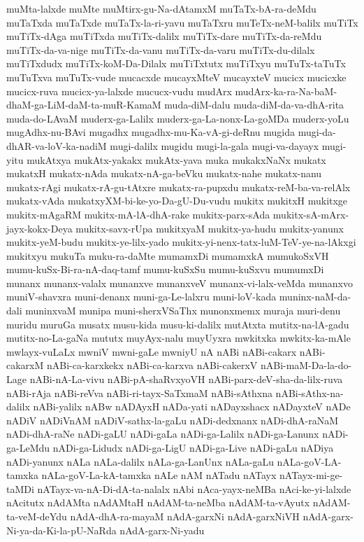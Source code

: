 {muMta-lalxde
muMte
muMtirx-gu-Na-dAtamxM
muTaTx-bA-ra-deMdu
muTaTxda
muTaTxde
muTaTx-la-ri-yavu
muTaTxru
muTeTx-neM-balilx
muTiTx
muTiTx-dAga
muTiTxda
muTiTx-dalilx
muTiTx-dare
muTiTx-da-reMdu
muTiTx-da-va-nige
muTiTx-da-vanu
muTiTx-da-varu
muTiTx-du-dilalx
muTiTxdudx
muTiTx-koM-Da-Dilalx
muTiTxtutx
muTiTxyu
muTuTx-taTuTx
muTuTxva
muTuTx-vude
mucacxde
mucayxMteV
mucayxteV
mucicx
mucicxke
mucicx-ruva
mucicx-ya-lalxde
mucucx-vudu
mudArx
mudArx-ka-ra-Na-baM-dhaM-ga-LiM-daM-ta-muR-KamaM
muda-diM-dalu
muda-diM-da-va-dhA-rita
muda-do-LAvaM
muderx-ga-Lalilx
muderx-ga-La-nonx-La-goMDa
muderx-yoLu
mugAdhx-nu-BAvi
mugadhx
mugadhx-mu-Ka-vA-gi-deRnu
mugida
mugi-da-dhAR-va-loV-ka-nadiM
mugi-dalilx
mugidu
mugi-la-gala
mugi-va-dayayx
mugi-yitu
mukAtxya
mukAtx-yakakx
mukAtx-yava
muka
mukakxNaNx
mukatx
mukatxH
mukatx-nAda
mukatx-nA-ga-beVku
mukatx-nahe
mukatx-nanu
mukatx-rAgi
mukatx-rA-gu-tAtxre
mukatx-ra-pupxdu
mukatx-reM-ba-va-relAlx
mukatx-vAda
mukatxyXM-bi-ke-yo-Da-gU-Du-vudu
mukitx
mukitxH
mukitxge
mukitx-mAgaRM
mukitx-mA-lA-dhA-rake
mukitx-parx-sAda
mukitx-sA-mArx-jayx-kokx-Deya
mukitx-savx-rUpa
mukitxyaM
mukitx-ya-hudu
mukitx-yanunx
mukitx-yeM-budu
mukitx-ye-lilx-yado
mukitx-yi-nenx-tatx-luM-TeV-ye-na-lAkxgi
mukitxyu
mukuTa
muku-ra-daMte
mumamxDi
mumamxkA
mumukoSxVH
mumu-kuSx-Bi-ra-nA-daq-tamf
mumu-kuSxSu
mumu-kuSxvu
mumumxDi
munanx
munanx-valalx
munanxve
munanxveV
munanx-vi-lalx-veMda
munanxvo
muniV-shavxra
muni-denanx
muni-ga-Le-lalxru
muni-loV-kada
muninx-naM-da-dali
muninxvaM
munipa
muni-sherxVSaThx
munonxmemx
muraja
muri-denu
muridu
muruGa
musatx
musu-kida
musu-ki-dalilx
mutAtxta
mutitx-na-lA-gadu
mutitx-no-La-gaNa
mututx
muyAyx-nalu
muyUyxra
mwkitxka
mwkitx-ka-mAle
mwlayx-vuLaLx
mwniV
mwni-gaLe
mwniyU
nA
nABi
nABi-cakarx
nABi-cakarxM
nABi-ca-karxkekx
nABi-ca-karxva
nABi-cakerxV
nABi-maM-Da-la-do-Lage
nABi-nA-La-vivu
nABi-pA-shaRvxyoVH
nABi-parx-deV-sha-da-lilx-ruva
nABi-rAja
nABi-reVva
nABi-ri-tayx-SaTxmaM
nABi-sAthxna
nABi-sAthx-na-dalilx
nABi-yalilx
nABw
nADAyxH
nADa-yati
nADayxshacx
nADayxteV
nADe
nADiV
nADiVnAM
nADiV-sathx-la-gaLu
nADi-dedxnanx
nADi-dhA-raNaM
nADi-dhA-raNe
nADi-gaLU
nADi-gaLa
nADi-ga-Lalilx
nADi-ga-Lanunx
nADi-ga-LeMdu
nADi-ga-Lidudx
nADi-ga-LigU
nADi-ga-Live
nADi-gaLu
nADiya
nADi-yanunx
nALa
nALa-dalilx
nALa-ga-LanUnx
nALa-gaLu
nALa-goV-LA-tamxka
nALa-goV-La-kA-tamxka
nALe
nAM
nATadu
nATayx
nATayx-mi-ge-taMDi
nATayx-va-nA-Di-dA-ta-nalalx
nAbi
nAca-yayx-neMBa
nAci-ke-yi-lalxde
nAcitutx
nAdAMta
nAdAMtaH
nAdAM-ta-neMba
nAdAM-ta-vAyutx
nAdAM-ta-veM-deYdu
nAdA-dhA-ra-mayaM
nAdA-garxNi
nAdA-garxNiVH
nAdA-garx-Ni-ya-da-Ki-la-pU-NaRda
nAdA-garx-Ni-yadu
}
